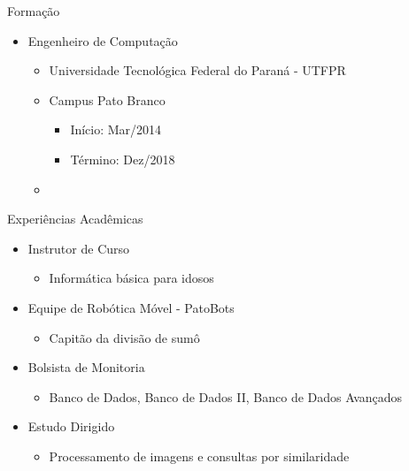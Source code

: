 \documentclass{beamer}
\begin{document}
\begin{frame}{Formação}
 
 \begin{itemize}
  \item Engenheiro de Computação\\
    \begin{itemize}
      \item[] Universidade Tecnológica Federal do Paraná - UTFPR
      \item[] Campus Pato Branco\newline
      \begin{itemize}
	 \item[] Início: Mar/2014
	  \item[] Término: Dez/2018\newline
      \end{itemize}
      \item[] 
    
    \end{itemize}
    
 \end{itemize}

 
\end{frame}

\begin{frame}{Experiências Acadêmicas}
 
  \begin{itemize}
   \item Instrutor de Curso
      \begin{itemize}
	\item[] Informática básica para idosos\newline
      \end{itemize}
      
   \item Equipe de Robótica Móvel - PatoBots
      \begin{itemize}
	\item[] Capitão da divisão de sumô\newline
      \end{itemize}
      
   \item Bolsista de Monitoria
      \begin{itemize}
	\item[] Banco de Dados, Banco de Dados II, Banco de Dados Avançados\newline
      \end{itemize}
      
   \item Estudo Dirigido
      \begin{itemize}
	\item[] Processamento de imagens e consultas por similaridade\newline
      \end{itemize}
  \end{itemize}

 
\end{frame}
\end{document}
